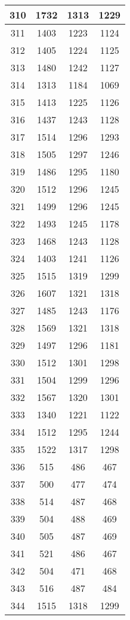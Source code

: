 \begin{table}[H]
\begin{tabular}{|c|c|c|c|}
\hline
310 & 1732 & 1313 & 1229 \\
\hline
311 & 1403 & 1223 & 1124 \\
\hline
312 & 1405 & 1224 & 1125 \\
\hline
313 & 1480 & 1242 & 1127 \\
\hline
314 & 1313 & 1184 & 1069 \\
\hline
315 & 1413 & 1225 & 1126 \\
\hline
316 & 1437 & 1243 & 1128 \\
\hline
317 & 1514 & 1296 & 1293 \\
\hline
318 & 1505 & 1297 & 1246 \\
\hline
319 & 1486 & 1295 & 1180 \\
\hline
320 & 1512 & 1296 & 1245 \\
\hline
321 & 1499 & 1296 & 1245 \\
\hline
322 & 1493 & 1245 & 1178 \\
\hline
323 & 1468 & 1243 & 1128 \\
\hline
324 & 1403 & 1241 & 1126 \\
\hline
325 & 1515 & 1319 & 1299 \\
\hline
326 & 1607 & 1321 & 1318 \\
\hline
327 & 1485 & 1243 & 1176 \\
\hline
328 & 1569 & 1321 & 1318 \\
\hline
329 & 1497 & 1296 & 1181 \\
\hline
330 & 1512 & 1301 & 1298 \\
\hline
331 & 1504 & 1299 & 1296 \\
\hline
332 & 1567 & 1320 & 1301 \\
\hline
333 & 1340 & 1221 & 1122 \\
\hline
334 & 1512 & 1295 & 1244 \\
\hline
335 & 1522 & 1317 & 1298 \\
\hline
336 & 515 & 486 & 467 \\
\hline
337 & 500 & 477 & 474 \\
\hline
338 & 514 & 487 & 468 \\
\hline
339 & 504 & 488 & 469 \\
\hline
340 & 505 & 487 & 469 \\
\hline
341 & 521 & 486 & 467 \\
\hline
342 & 504 & 471 & 468 \\
\hline
343 & 516 & 487 & 484 \\
\hline
344 & 1515 & 1318 & 1299 \\

\end{tabular}
\end{table}

